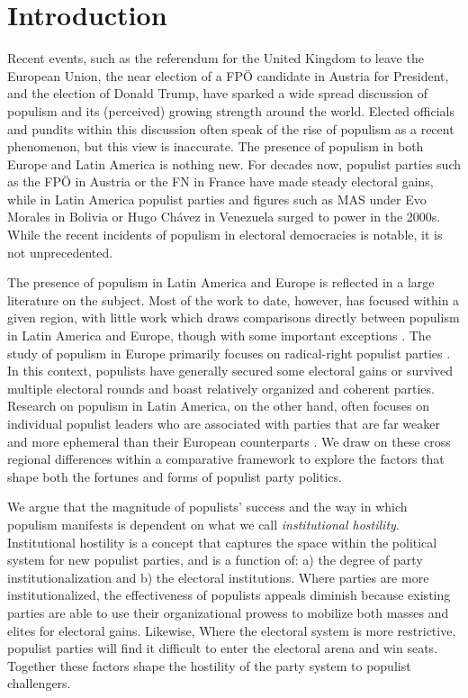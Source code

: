 \documentclass[a4paper,12pt]{article}\usepackage[]{graphicx}\usepackage[]{color}
\begin{document}
\newpage

\setcounter{page}{1}
\onehalfspacing

\section*{Introduction}
Recent events, such as the referendum for the United Kingdom to leave the European Union, the near election of a FP\"{O} candidate in Austria for President, and the election of Donald Trump, have sparked a wide spread discussion of populism and its (perceived) growing strength around the world. Elected officials and pundits within this discussion often speak of the rise of populism as a recent phenomenon, but this view is inaccurate. The presence of populism in both Europe and Latin America is nothing new. For decades now, populist parties such as the FP\"{O} in Austria or the FN in France have made steady electoral gains, while in Latin America populist parties and figures such as MAS under Evo Morales in Bolivia or Hugo Ch\'{a}vez in Venezuela surged to power in the 2000s. While the recent incidents of populism in electoral democracies is notable, it is not unprecedented. 
\par	
The presence of populism in Latin America and Europe is reflected in a large literature on the subject. Most of the work to date, however, has focused within a given region, with little work which draws comparisons directly between populism in Latin America and Europe, though with some important exceptions \citep{mudde2011voices, mudde2013exclusionary, hawkins2015mapping}. %
 The study of populism in Europe primarily focuses on radical-right populist parties \citep{betz1994radical, mudde2007populist}. In this context, populists  have generally secured some electoral gains or survived multiple electoral rounds and boast relatively organized and coherent parties. Research on populism in Latin America, on the other hand, often focuses on individual populist leaders who are associated with parties that are far weaker and more ephemeral than their European counterparts \citep{conniff2012populism}. We draw on these cross regional differences within a comparative framework to explore the factors that shape both the fortunes and forms of populist party politics.
\par
We argue that the magnitude of populists' success and the way in which populism manifests is dependent on what we call \textit{institutional hostility}.  Institutional hostility is a concept that captures the space within the political system for new populist parties, and is a function of: a) the degree of party institutionalization and b) the electoral institutions. Where parties are more institutionalized, the effectiveness of populists appeals diminish because existing parties are able to use their organizational prowess to mobilize both masses and elites for electoral gains. Likewise, Where the electoral system is more restrictive, populist parties will find it difficult to enter the electoral arena and win seats. Together these factors shape the hostility of the party system to populist challengers.
\end{document}
